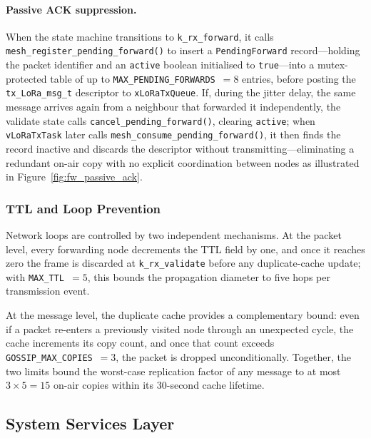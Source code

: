 \documentclass[english,bachelor]{tfgitic}[2026/01/22]
\begin{document}
\paragraph{Passive ACK suppression.}
When the state machine transitions to \texttt{k\_rx\_forward}, it calls
\texttt{mesh\_register\_pending\_forward()} to insert a \texttt{PendingForward}
record---holding the packet identifier and an \texttt{active} boolean initialised to
\texttt{true}---into a mutex-protected table of up to
\texttt{MAX\_PENDING\_FORWARDS}~$= 8$ entries, before posting the
\texttt{tx\_LoRa\_msg\_t} descriptor to \texttt{xLoRaTxQueue}. If, during the jitter
delay, the same message arrives again from a neighbour that forwarded it
independently, the validate state calls \texttt{cancel\_pending\_forward()},
clearing \texttt{active}; when \texttt{vLoRaTxTask} later calls
\texttt{mesh\_consume\_pending\_forward()}, it then finds the record inactive and
discards the descriptor without transmitting---eliminating a redundant on-air copy
with no explicit coordination between nodes as illustrated in Figure~\ref{fig:fw_passive_ack}.


\subsubsection{TTL and Loop Prevention}
\label{sec:fw_ttl}

Network loops are controlled by two independent mechanisms. At the packet level,
every forwarding node decrements the TTL field by one, and once it reaches zero the
frame is discarded at \texttt{k\_rx\_validate} before any duplicate-cache update;
with \texttt{MAX\_TTL}~$= 5$, this bounds the propagation diameter to five hops per
transmission event.

At the message level, the duplicate cache provides a complementary bound: even if a
packet re-enters a previously visited node through an unexpected cycle, the cache
increments its copy count, and once that count exceeds
\texttt{GOSSIP\_MAX\_COPIES}~$= 3$, the packet is dropped unconditionally. Together,
the two limits bound the worst-case replication factor of any message to at most
$3 \times 5 = 15$ on-air copies within its 30-second cache lifetime.


\subsection{System Services Layer}
\label{sec:fw_services}
\end{document}
